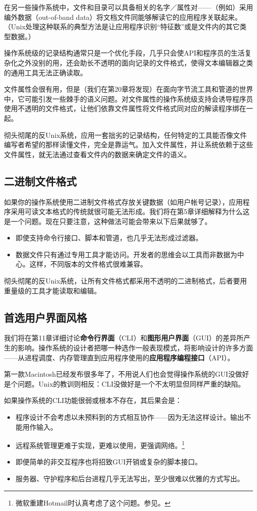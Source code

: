\documentclass[12pt,oneside]{book}
\begin{document}
在另一些操作系统中，文件和目录可以具备相关的名字／属性对——（例如）采用编外数据（out-of-band data）将文档文件同能够解读它的应用程序关联起来。（Unix处理这种联系的典型方法是让应用程序识别“特征数”或是文件内的其它类型数据。）

操作系统级的记录结构通常只是一个优化手段，几乎只会使API和程序员的生活复杂化之外没别的用，还会助长不透明的面向记录的文件格式，使得文本编辑器之类的通用工具无法正确读取。

文件属性会很有用，但是（我们在第20章将发现）在面向字节流工具和管道的世界中，它可能引发一些棘手的语义问题。对文件属性的操作系统级支持会诱导程序员使用不透明的文件格式，让他们依靠文件属性将文件格式同对应的解读程序绑在一起。

彻头彻尾的反Unix系统，应用一套拙劣的记录结构，任何特定的工具能否像文件编写者希望的那样读懂文件，完全是靠运气。加入文件属性，并让系统依赖于这些文件属性，就无法通过查看文件内的数据来确定文件的语义。

\subsection{二进制文件格式}
如果你的操作系统使用二进制文件格式存放关键数据（如用户帐号记录），应用程序采用可读文本格式的传统就很可能无法形成。我们将在第5章详细解释为什么这是一个问题。现在只要注意，这种做法可能会带来以下后果就够了。

\begin{itemize}
\item 即使支持命令行接口、脚本和管道，也几乎无法形成过滤器。
\item 数据文件只有通过专用工具才能访问。开发者的思维会以工具而非数据为中心。这样，不同版本的文件格式很难兼容。
\end{itemize}

彻头彻尾的反Unix系统，让所有文件格式都采用不透明的二进制格式，后者要用重量级的工具才能读取和编辑。

\subsection{首选用户界面风格}
我们将在第11章详细讨论\textbf{命令行界面}（CLI）和\textbf{图形用户界面}（GUI）的差异所产生的影响。操作系统的设计者把哪一种选作一般表现模式，将影响设计的许多方面——从进程调度、内存管理直到应用程序使用的\textbf{应用程序编程接口}（API）。

第一款Macintosh已经发布很多年了，不用说人们也会觉得操作系统的GUI没做好是个问题。Unix的教训则相反：CLI没做好是一个不太明显但同样严重的缺陷。

如果操作系统的CLI功能很弱或根本不存在，其后果会是：
\begin{itemize}
\item 程序设计不会考虑以未预料到的方式相互协作——因为无法这样设计。输出不能用作输入。
\item 远程系统管理更难于实现，更难以使用，更强调网络。\footnote{微软重建Hotmail时认真考虑了这个问题。参见\cite{BrooksD}。}
\item 即便简单的非交互程序也将招致GUI开销或复杂的脚本接口。
\item 服务器、守护程序和后台进程几乎无法写出，至少很难以优雅的方式写出。
\end{itemize}
\end{document}
